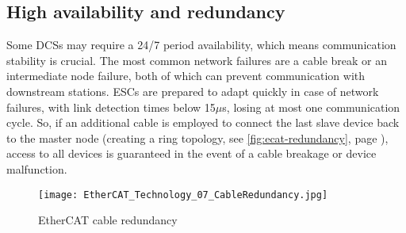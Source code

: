 \subsection{High availability and redundancy}

Some DCSs may require a 24/7 period availability, which means communication stability is crucial.
The most common network failures are a cable break or an intermediate node failure, both of which can prevent communication with downstream stations.
ESCs are prepared to adapt quickly in case of network failures, with link detection times below 15$\mu$s, losing at most one communication cycle.
So, if an additional cable is employed to connect the last slave device back to the master node (creating a ring topology, see \autoref{fig:ecat-redundancy}, page \pageref{fig:ecat-redundancy}), access to all devices is guaranteed in the event of a cable breakage or device malfunction.

\begin{figure}[t]
	\centering
	\texttt{[image: EtherCAT\_Technology\_07\_CableRedundancy.jpg]}
	\caption{EtherCAT cable redundancy \cite{protocol:ethercat}}
	\label{fig:ecat-redundancy}
\end{figure}


